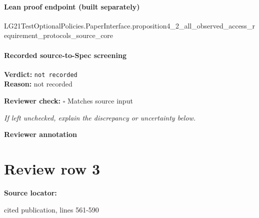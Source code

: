 \documentclass[10pt]{article}
\newcommand{\reviewerbox}{%
  \par\noindent\fbox{\parbox{0.96\linewidth}{\rule{0pt}{0.38in}}}\par
}
\newcommand{\reviewmatch}[1]{%
  \par\noindent\textbf{Reviewer check:} $\square$\; #1\par
  \noindent\emph{If left unchecked, explain the discrepancy or uncertainty below.}\par
}
\begin{document}
\paragraph{Lean proof endpoint (built separately)}\begin{ReviewVerbatim}
LG21TestOptionalPolicies.PaperInterface.proposition4_2_all_observed_access_requirement_protocols_source_core
\end{ReviewVerbatim}

\paragraph{Recorded source-to-Spec screening}
\textbf{Verdict:} \texttt{not recorded}
\\
\textbf{Reason:} not recorded
\reviewmatch{Matches source input}
\noindent\textbf{Reviewer annotation}\par
\reviewerbox
\clearpage
\hypertarget{source-claim-28b3cd5bec7dd4f5}{}
\section*{Review row 3}
\textbf{Source locator:} {\footnotesize\raggedright cited publication, lines 561-\allowbreak{}590\par}
\end{document}
